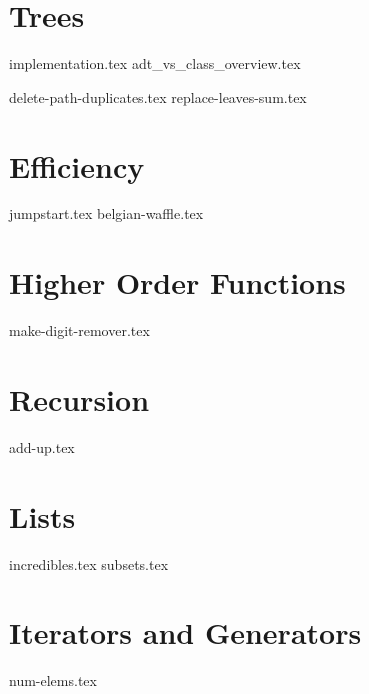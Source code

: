 \documentclass{exam}
\begin{document}
\section{Trees}
{implementation.tex}
{adt_vs_class_overview.tex}
\begin{questions}
    {delete-path-duplicates.tex}
    \newpage
    {replace-leaves-sum.tex}
\end{questions}

\section{Efficiency}
\begin{questions}
    {jumpstart.tex}
    {belgian-waffle.tex}
\end{questions}

\section{Higher Order Functions}
\begin{questions}
    {make-digit-remover.tex}
\end{questions}

\section{Recursion}
\begin{questions}
    {add-up.tex}
\end{questions}

\section{Lists}
\begin{questions}
    {incredibles.tex}
    {subsets.tex}
\end{questions}

\newpage

\section{Iterators and Generators}
\begin{questions}
    {num-elems.tex}
\end{questions}
\end{document}
